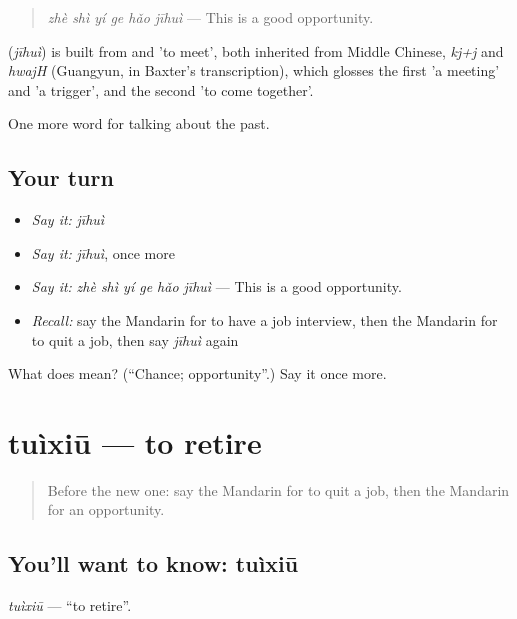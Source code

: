\begin{quote}
\textbf{} \emph{zhè shì yí ge hǎo jīhuì} — This is a good opportunity.
\end{quote}

\begin{cousinweb}
\textbf{} (\emph{jīhuì}) is built from  and  'to meet', both inherited from Middle Chinese, \emph{kj+j} and \emph{hwajH} (Guangyun, in Baxter's transcription), which glosses the first 'a meeting' and 'a trigger', and the second 'to come together'.
\end{cousinweb}

\begin{grammarlens}[title={What you've built}]
One more word for talking about the past.
\end{grammarlens}

\subsection*{Your turn}
\begin{itemize}
\raggedright
  \item \emph{Say it:} \emph{jīhuì}
  \item \emph{Say it:} \emph{jīhuì}, once more
  \item \emph{Say it:} \emph{zhè shì yí ge hǎo jīhuì} — This is a good opportunity.
  \item \emph{Recall:} say the Mandarin for to have a job interview, then the Mandarin for to quit a job, then say \emph{jīhuì} again
\end{itemize}

\begin{tcolorbox}[breakable,colback=teal!4,colframe=teal!35!black,title={Before you move on}]
What does  mean? (\textquotedblleft{}Chance; opportunity\textquotedblright{}.) Say it once more.
\end{tcolorbox}
\section[tuìxiū]{tuìxiū — to retire}

\label{lesson:ZH-C276-tuixiu}



\begin{quote}
Before the new one: say the Mandarin for to quit a job, then the Mandarin for an opportunity.
\end{quote}

\subsection*{You'll want to know: tuìxiū}
\emph{tuìxiū} — \textquotedblleft{}to retire\textquotedblright{}.

